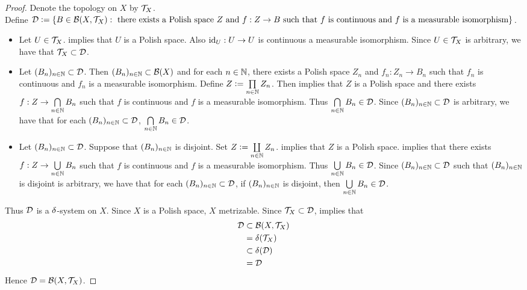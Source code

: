 \documentclass{book}
\begin{document}
	\begin{proof} 
		Denote the topology on $X$ by $\mathcal{T}_X$. \\
		Define $\mathcal{D} \vcentcolon= \{B \in \mathcal{B}(X, \mathcal{T}_X): \text{ there exists a Polish space $Z$ and $f:Z \rightarrow B$ such that $f$ is continuous} \\ \text{ and $f$ is a measurable isomorphism}\}$.
		\begin{itemize}
			\item Let $U \in \mathcal{T}_X$.  implies that $U$ is a Polish space. Also $\operatorname{id}_U:U \rightarrow U$ is continuous a measurable isomorphism. Since $U \in \mathcal{T}_X$ is arbitrary, we have that $\mathcal{T}_X \subset \mathcal{D}$.
			\item Let $(B_n)_{n \in \mathbb{N}} \subset \mathcal{D}$. Then $(B_n)_{n \in \mathbb{N}} \subset \mathcal{B}(X)$ and for each $n \in \mathbb{N}$, there exists a Polish space $Z_n$ and $f_n:Z_n \rightarrow B_n$ such that $f_n$ is continuous and $f_n$ is a measurable isomorphism. Define $Z \vcentcolon= \prod\limits_{n \in \mathbb{N}} Z_n$. Then  implies that $Z$ is a Polish space and there exists $f: Z \rightarrow \bigcap\limits_{n \in \mathbb{N}} B_n$ such that $f$ is continuous and $f$ is a measurable isomorphism. Thus $\bigcap\limits_{n \in \mathbb{N}} B_n \in \mathcal{D}$. Since $(B_n)_{n \in \mathbb{N}} \subset \mathcal{D}$ is arbitrary, we have that for each $(B_n)_{n \in \mathbb{N}} \subset \mathcal{D}$, $\bigcap\limits_{n \in \mathbb{N}} B_n \in \mathcal{D}$. 
			\item Let $(B_n)_{n \in \mathbb{N}} \subset \mathcal{D}$. Suppose that $(B_n)_{n \in \mathbb{N}}$ is disjoint. Set $Z \vcentcolon= \coprod\limits_{n \in \mathbb{N}} Z_n$.  implies that $Z$ is a Polish space.  implies that there exists $f: Z \rightarrow \bigcup\limits_{n \in \mathbb{N}} B_n$ such that $f$ is continuous and $f$ is a measurable isomorphism. Thus $\bigcup\limits_{n \in \mathbb{N}} B_n \in \mathcal{D}$. Since $(B_n)_{n \in \mathbb{N}} \subset \mathcal{D}$ such that $(B_n)_{n \in \mathbb{N}}$ is disjoint is arbitrary, we have that for each $(B_n)_{n \in \mathbb{N}} \subset \mathcal{D}$, if $(B_n)_{n \in \mathbb{N}}$ is disjoint, then $\bigcup\limits_{n \in \mathbb{N}} B_n \in \mathcal{D}$. 
		\end{itemize}
		Thus $\mathcal{D}$ is a $\delta$-system on $X$. Since $X$ is a Polish space, $X$ metrizable. Since $\mathcal{T}_X \subset \mathcal{D}$,   implies that
		\begin{align*}
			\mathcal{D} & \subset \mathcal{B}(X, \mathcal{T}_X) \\
			& = \delta(\mathcal{T}_X) \\
			& \subset \delta(\mathcal{D}) \\
			& = \mathcal{D} 
		\end{align*}
		Hence $\mathcal{D} = \mathcal{B}(X, \mathcal{T}_X)$. 
	\end{proof}
	
\end{document}
